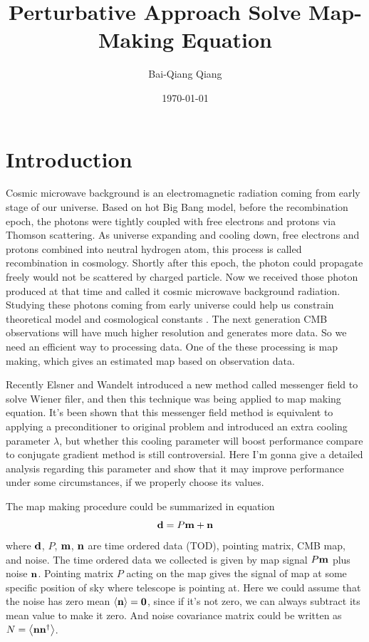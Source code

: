 \documentclass[11pt, letterpaper]{article}
\title{Perturbative Approach Solve Map-Making Equation}
\author{Bai-Qiang Qiang}
\date{\today}
\newcommand{\vbd}{\vb{d}}
\newcommand{\vbm}{\vb{m}}
\newcommand{\vbn}{\vb{n}}
\begin{document}
\maketitle

\section{Introduction}
Cosmic microwave background is an electromagnetic radiation coming from early
stage of our universe. Based on hot Big Bang model, before the recombination
epoch, the photons were tightly coupled with free electrons and protons via 
Thomson scattering. As universe expanding and cooling down, free electrons and
protons combined into neutral hydrogen atom, this process is called 
recombination in cosmology. Shortly after this epoch, the photon could
propagate freely would not be scattered by charged particle. Now we received 
those photon produced at that time and called it cosmic microwave background
radiation. Studying these photons coming from early universe could help us
constrain theoretical model and cosmological constants
\cite{10.1093/ptep/ptaa104}.
The next generation CMB observations will have much higher resolution and 
generates more data.
So we need an efficient way to processing data.
One of the these processing is map making, which gives an estimated map based 
on observation data.

Recently Elsner and Wandelt\cite{2013A&A...549A.111E} introduced a new
method called messenger field to solve Wiener filer, and then this technique
was being applied to map making equation\cite{Huffenberger_2018}.
It's been shown that this messenger field method is equivalent to applying a
preconditioner to original problem and introduced an extra cooling parameter
$\lambda$, but whether this cooling parameter will boost performance compare to
conjugate gradient method is still controversial\cite{2018A&A...620A..59P}.
Here I'm gonna give a detailed analysis regarding this parameter and show that
it may improve performance under some circumstances, if we properly choose
its values.

The map making procedure could be summarized in equation
\begin{equation}
\vbd = P\vbm + \vbn \label{map making model}
\end{equation}
where $\vbd$, $P$, $\vbm$, $\vbn$ are time ordered data (TOD), pointing matrix,
CMB map, and noise.
The time ordered data we collected is given by map signal $P\vbm$ plus noise 
$\vbn$.
Pointing matrix $P$ acting on the map gives the signal of map at some specific 
position of sky where telescope is pointing at.
Here we could assume that the noise has zero mean $\ev{\vbn} = \vb{0}$,
since if it's not zero, we can always subtract its mean value to make it zero.
And noise covariance matrix could be written as $N = \ev{\vbn \vbn^{\dagger}}$.
\end{document}
